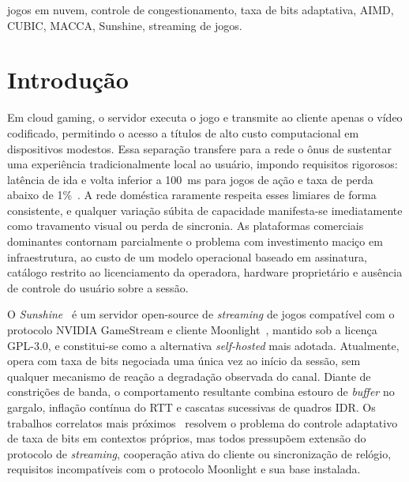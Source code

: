 \documentclass[conference]{IEEEtran}
\begin{document}
\begin{IEEEkeywords}
jogos em nuvem, controle de congestionamento, taxa de bits adaptativa,
AIMD, CUBIC, MACCA, Sunshine, streaming de jogos.
\end{IEEEkeywords}

\section{Introdução}\label{sec:introducao}

Em cloud gaming, o servidor executa o jogo e transmite ao cliente apenas o vídeo codificado, permitindo o acesso a títulos de alto custo computacional em dispositivos modestos.
Essa separação transfere para a rede o ônus de sustentar uma
experiência tradicionalmente local ao usuário, impondo
requisitos rigorosos: latência de ida e volta inferior a
\SI{100}{\milli\second} para jogos de ação e taxa de perda
abaixo de 1\%~\cite{baldovino2022}. A rede doméstica raramente
respeita esses limiares de forma consistente, e qualquer
variação súbita de capacidade manifesta-se imediatamente como
travamento visual ou perda de sincronia. As plataformas
comerciais dominantes contornam parcialmente o problema com
investimento maciço em infraestrutura, ao custo de um modelo
operacional baseado em assinatura, catálogo restrito ao
licenciamento da operadora, hardware proprietário e ausência
de controle do usuário sobre a sessão.

O \emph{Sunshine}~\cite{sunshine} é um servidor open-source de \emph{streaming}
de jogos compatível com o protocolo NVIDIA GameStream e
cliente Moonlight~\cite{moonlight}, mantido sob a licença GPL-3.0, e
constitui-se como a alternativa \emph{self-hosted} mais
adotada. Atualmente, opera com taxa de bits negociada uma
única vez ao início da sessão, sem qualquer mecanismo de
reação a degradação observada do canal. Diante de constrições
de banda, o comportamento resultante combina estouro de
\emph{buffer} no gargalo, inflação contínua do RTT e cascatas
sucessivas de quadros IDR. Os trabalhos correlatos mais
próximos~\cite{alos2019,abragame,gcc} resolvem o problema do
controle adaptativo de taxa de bits em contextos próprios,
mas todos pressupõem extensão do protocolo de \emph{streaming},
cooperação ativa do cliente ou sincronização de relógio,
requisitos incompatíveis com o protocolo Moonlight e sua base
instalada.
\end{document}
